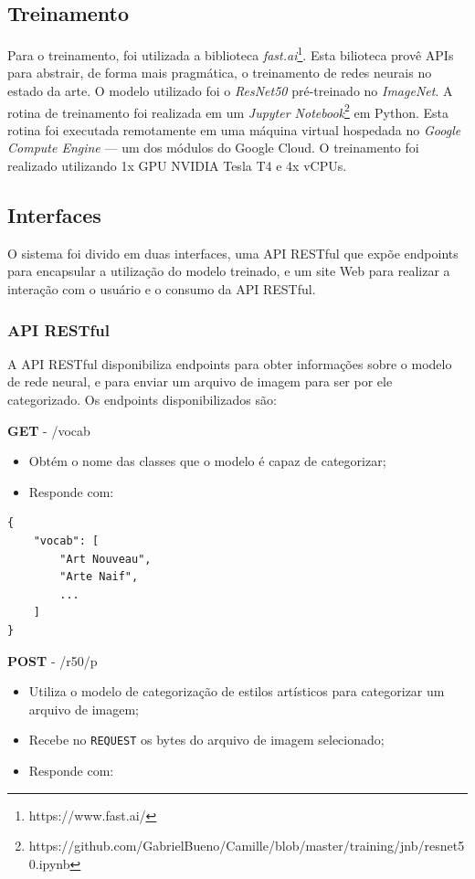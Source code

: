 \documentclass[12pt, a4paper]{article}
\begin{document}
\subsection{Treinamento}
Para o treinamento, foi utilizada a biblioteca \emph{fast.ai}\footnote{https://www.fast.ai/}. Esta bilioteca provê APIs para abstrair, de forma mais pragmática, o treinamento de redes neurais no estado da arte. O modelo utilizado foi o \emph{ResNet50} pré-treinado no \emph{ImageNet}. A rotina de treinamento foi realizada em um \emph{Jupyter Notebook}\footnote{https://github.com/GabrielBueno/Camille/blob/master/training/jnb/resnet50.ipynb} em Python. Esta rotina foi executada remotamente em uma máquina virtual hospedada no \emph{Google Compute Engine} --- um dos módulos do Google Cloud. O treinamento foi realizado utilizando 1x GPU NVIDIA Tesla T4 e 4x vCPUs.

\subsection{Interfaces}
O sistema foi divido em duas interfaces, uma API RESTful que expõe endpoints para encapsular a utilização do modelo treinado, e um site Web para realizar a interação com o usuário e o consumo da API RESTful.

\subsubsection{API RESTful}
A API RESTful disponibiliza endpoints para obter informações sobre o modelo de rede neural, e para enviar um arquivo de imagem para ser por ele categorizado. Os endpoints disponibilizados são:

\newpage
\noindent
\textbf{GET} - /vocab

\begin{itemize}
\item Obtém o nome das classes que o modelo é capaz de categorizar;
\item Responde com:
\end{itemize}

\begin{lstlisting}
{
	"vocab": [
		"Art Nouveau", 
		"Arte Naif", 
		...
	]
}
\end{lstlisting}

\noindent
\textbf{POST} - /r50/p

\begin{itemize}
\item Utiliza o modelo de categorização de estilos artísticos para categorizar um arquivo de imagem;
\item Recebe no \lstinline{REQUEST} os bytes do arquivo de imagem selecionado;
\item Responde com:
\end{itemize}
\end{document}
